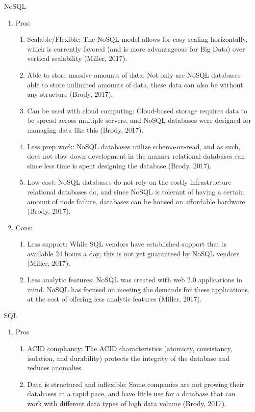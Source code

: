 \documentclass[]{article}
\begin{document}
\begin{enumerate}
	NoSQL
		\begin{enumerate}
			\item Pros:
			\begin{enumerate}
				\item Scalable/Flexible:  The NoSQL model allows for easy scaling horizontally, which is currently favored (and is more advantageous for Big Data) over vertical scalability (Miller, 2017).  
				\item Able to store massive amounts of data: Not only are NoSQL databases able to store unlimited amounts of data, these data can also be without any structure (Brody, 2017).
				\item Can be used with cloud computing: Cloud-based storage requires data to be spread across multiple servers, and NoSQL databases were designed for managing data like this (Brody, 2017).
				\item Less prep work: NoSQL databases utilize schema-on-read, and as such, does not slow down development in the manner relational databases can since less time is spent designing the database (Brody, 2017).
				\item Low cost: NoSQL databases do not rely on the costly infrastructure relational databases do, and since NoSQL is tolerant of having a certain amount of node failure, databases can be housed on affordable hardware (Brody, 2017).
			\end{enumerate}
			\item Cons:
			\begin{enumerate}
				\item Less support:  While SQL vendors have established support that is available 24 hours a day, this is not yet guaranteed by NoSQL vendors (Miller, 2017).
				\item Less analytic features:  NoSQL was created with web 2.0 applications in mind.  NoSQL has focused on meeting the demands for these applications, at the cost of offering less analytic features (Miller, 2017).
			\end{enumerate}
		\end{enumerate}
	SQL
		\begin{enumerate}
			\item Pros
			\begin{enumerate}
				\item ACID compliancy: The ACID characteristics (atomicty, consistancy, isolation, and durability) protects the integrity of the database and reduces anomalies.
				\item Data is structured and inflexible: Some companies are not growing their databases at a rapid pace, and have little use for a database that can work with different data types of high data volume (Brody, 2017).

\end{enumerate}
\end{enumerate}
\end{enumerate}
\end{document}

